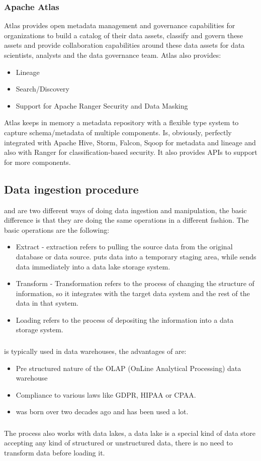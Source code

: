 \subsubsection{Apache Atlas}
Atlas provides open metadata management and governance capabilities for organizations to build a catalog of their data assets, classify and govern these assets and provide collaboration capabilities around these data assets for data scientists, analysts and the data governance team. \n
Atlas also provides:
\begin{itemize}
    \item Lineage
    \item Search/Discovery
    \item Support for Apache Ranger Security and Data Masking
\end{itemize}
Atlas keeps in memory a metadata repository with a flexible type system to capture schema/metadata of multiple components. \n
Is, obviously, perfectly integrated with Apache Hive, Storm, Falcon, Sqoop for metadata and lineage and also with Ranger for classification-based security. \n
It also provides APIs to support for more components. \n
\subsection{Data ingestion procedure}
\etl and \elt are two different ways of doing data ingestion and manipulation, the basic difference is that they are doing the same operations in a different fashion. \n
The basic operations are the following:
\begin{itemize}
    \item Extract - extraction refers to pulling the source data from the original database or data source. \etl puts data into a temporary staging area, while \elt sends data immediately into a data lake storage system.
    \item Transform - Transformation refers to the process of changing the structure of information, so it integrates with the target data system and the rest of the data in that system.
    \item Loading refers to the process of depositing the information into a data storage system.
\end{itemize}
\subsubsection{\etl}
\etl is typically used in data warehouses, the advantages of \etl are:
\begin{itemize}
    \item Pre structured nature of the OLAP (OnLine Analytical Processing) data warehouse
    \item Compliance to various laws like GDPR, HIPAA or CPAA.
    \item \etl was born over two decades ago and has been used a lot.
\end{itemize}
\subsubsection{\etl}
The \etl process also works with data lakes, a data lake is a special kind of data store accepting any kind of structured or unstructured data, there is no need to transform data before loading it. \n
